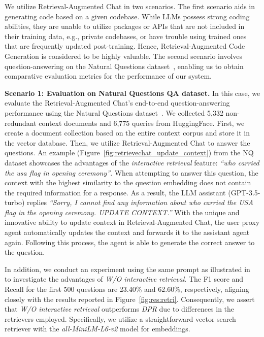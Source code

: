 We utilize Retrieval-Augmented Chat in two scenarios. The first scenario aids in generating code based on a given codebase. While LLMs possess strong coding abilities, they are unable to utilize packages or APIs that are not included in their training data, e.g., private codebases, or have trouble using trained ones that are frequently updated post-training. Hence, Retrieval-Augmented Code Generation is considered to be highly valuable. The second scenario involves question-answering on the Natural Questions dataset~\cite{kwiatkowski2019natural}, enabling us to obtain comparative evaluation metrics for the performance of our system.


\textbf{Scenario 1: Evaluation on Natural Questions QA dataset.}
In this case, we evaluate the Retrieval-Augmented Chat's end-to-end question-answering performance using the Natural Questions dataset~\cite{kwiatkowski2019natural}. We collected 5,332 non-redundant context documents and 6,775 queries from HuggingFace. First, we create a document collection based on the entire context corpus and store it in the vector database. Then, we utilize Retrieval-Augmented Chat to answer the questions. An example (Figure~\ref{fig:retrievechat_update_context}) from the NQ dataset showcases the advantages of the \textit{interactive retrieval} feature: \textit{``who carried the usa flag in opening ceremony''}. When attempting to answer this question, the context with the highest similarity to the question embedding does not contain the required information for a response. As a result, the LLM assistant (GPT-3.5-turbo) replies \textit{``Sorry, I cannot find any information about who carried the USA flag in the opening ceremony. UPDATE CONTEXT.''} With the unique and innovative ability to update context in Retrieval-Augmented Chat, the user proxy agent automatically updates the context and forwards it to the assistant agent again. Following this process, the agent is able to generate the correct answer to the question.

In addition, we conduct an experiment using the same prompt as illustrated in~\cite{adlakha2023evaluating} to investigate the advantages of \textit{\libName W/O interactive retrieval}. The F1 score and Recall for the first 500 questions are 23.40\% and 62.60\%, respectively, aligning closely with the results reported in Figure~\ref{fig:res:retri}. Consequently, we assert that \textit{\libName W/O interactive retrieval} outperforms \textit{DPR} due to differences in the retrievers employed. Specifically, we utilize a straightforward vector search retriever with the \textit{all-MiniLM-L6-v2} model for embeddings.

